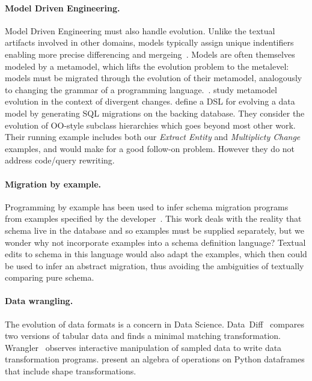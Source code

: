 \documentclass[english,submission]{programming}
\begin{document}
\paragraph{Model Driven Engineering.}
Model Driven Engineering must also handle evolution. Unlike the textual artifacts involved in other domains, models typically assign unique indentifiers enabling more precise differencing and mergeing~\cite{alanen2003}.
Models are often themselves modeled by a metamodel, which lifts the evolution problem to the metalevel: models must be migrated through the evolution of their metamodel, analogously to changing the grammar of a programming language.~\cite{Herrmannsdoerfer11}. \citet{Cicchetti11} study metamodel evolution in the context of divergent changes.
\citet{vermolen11} define a DSL for evolving a data model by generating SQL migrations on the backing database. They consider the evolution of OO-style subclass hierarchies which goes beyond most other work. Their running example includes both our \emph{Extract Entity} and \emph{Multiplicty Change} examples, and would make for a good follow-on problem. However they do not address code/query rewriting.

\paragraph{Migration by example.}
Programming by example has been used to infer schema migration programs from examples specified by the developer~\cite{wang20, Alexe11}.
This work deals with the reality that schema live in the database and so examples must be supplied separately, but we wonder why not incorporate examples into a schema definition language? Textual edits to schema in this language would also adapt the examples, which then could be used to infer an abstract migration, thus avoiding the ambiguities of textually comparing pure schema.

\paragraph{Data wrangling.} The evolution of data formats is a concern in Data Science. Data~Diff~\cite{sutton18} compares two versions of tabular data and finds a minimal matching transformation.
Wrangler~\cite{kandel11} observes interactive manipulation of sampled data to write data transformation programs.
\citet{petersohn20} present an algebra of operations on Python dataframes that include shape transformations.
\end{document}
